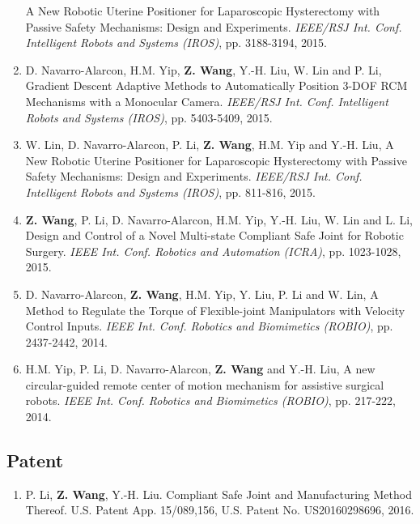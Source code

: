 \documentclass[10pt,letterpaper]{article}
\begin{document}
\begin{enumerate}
    A New Robotic Uterine Positioner for Laparoscopic Hysterectomy with Passive Safety Mechanisms: Design and Experiments.
    \textit{{IEEE/RSJ} Int. Conf. Intelligent Robots and Systems (IROS)}, pp. 3188-3194, 2015.
    \item D. Navarro-Alarcon, H.M. Yip, \textbf{Z. Wang}, Y.-H. Liu, W. Lin and P. Li,
    Gradient Descent Adaptive Methods to Automatically Position 3-DOF RCM Mechanisms with a Monocular Camera.
    \textit{{IEEE/RSJ} Int. Conf. Intelligent Robots and Systems (IROS)}, pp. 5403-5409, 2015.
    \item W. Lin, D. Navarro-Alarcon, P. Li, \textbf{Z. Wang}, H.M. Yip and Y.-H. Liu,
    A New Robotic Uterine Positioner for Laparoscopic Hysterectomy with Passive Safety Mechanisms: Design and Experiments.
    \textit{{IEEE/RSJ} Int. Conf. Intelligent Robots and Systems (IROS)}, pp. 811-816, 2015.
    \item \textbf{Z. Wang}, P. Li, D. Navarro-Alarcon, H.M. Yip, Y.-H. Liu, W. Lin and L. Li,
    Design and Control of a Novel Multi-state Compliant Safe Joint for Robotic Surgery.
    \textit{{IEEE} Int. Conf. Robotics and Automation (ICRA)}, pp. 1023-1028, 2015.
    \item D. Navarro-Alarcon, \textbf{Z. Wang}, H.M. Yip, Y. Liu, P. Li and W. Lin,
    A Method to Regulate the Torque of Flexible-joint Manipulators with Velocity Control Inputs.
    \textit{{IEEE} Int. Conf. Robotics and Biomimetics (ROBIO)}, pp. 2437-2442, 2014.
    \item H.M. Yip, P. Li, D. Navarro-Alarcon, \textbf{Z. Wang} and Y.-H. Liu,
    A new circular-guided remote center of motion mechanism for assistive surgical robots.
    \textit{{IEEE} Int. Conf. Robotics and Biomimetics (ROBIO)}, pp. 217-222, 2014.
\end{enumerate}

\subsection*{Patent}
\begin{enumerate}
    \item P. Li, \textbf{Z. Wang}, Y.-H. Liu.
    Compliant Safe Joint and Manufacturing Method Thereof.
    U.S. Patent App. 15/089,156, U.S. Patent No. US20160298696, 2016.
\end{enumerate}

\end{document}
